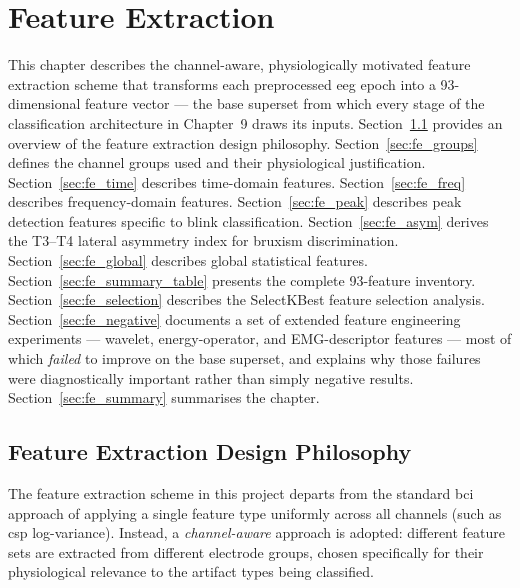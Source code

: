 \chapter{Feature Extraction}
\label{ch:feature_extraction}

This chapter describes the channel-aware, physiologically
motivated feature extraction scheme that transforms each
preprocessed \acrshort{eeg} epoch into a 93-dimensional
feature vector --- the base superset from which every stage of
the classification architecture in Chapter~9 draws its inputs.
Section~\ref{sec:fe_overview} provides an
overview of the feature extraction design philosophy.
Section~\ref{sec:fe_groups} defines the channel groups used
and their physiological justification. Section~\ref{sec:fe_time}
describes time-domain features. Section~\ref{sec:fe_freq}
describes frequency-domain features. Section~\ref{sec:fe_peak}
describes peak detection features specific to blink
classification. Section~\ref{sec:fe_asym} derives the T3--T4
lateral asymmetry index for bruxism discrimination.
Section~\ref{sec:fe_global} describes global statistical
features. Section~\ref{sec:fe_summary_table} presents the
complete 93-feature inventory. Section~\ref{sec:fe_selection}
describes the SelectKBest feature selection analysis.
Section~\ref{sec:fe_negative} documents a set of extended
feature engineering experiments --- wavelet, energy-operator,
and EMG-descriptor features --- most of which \emph{failed} to
improve on the base superset, and explains why those failures
were diagnostically important rather than simply negative
results. Section~\ref{sec:fe_summary} summarises the chapter.

\section{Feature Extraction Design Philosophy}
\label{sec:fe_overview}

The feature extraction scheme in this project departs from the
standard \acrshort{bci} approach of applying a single feature
type uniformly across all channels (such as \acrshort{csp}
log-variance). Instead, a \textit{channel-aware} approach is
adopted: different feature sets are extracted from different
electrode groups, chosen specifically for their physiological
relevance to the artifact types being classified.

